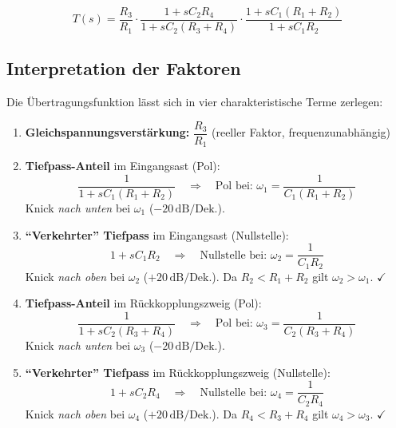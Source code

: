 \documentclass[12pt,a4paper]{article}
\begin{document}
\begin{tcolorbox}[ergebnis, title={\"Ubertragungsfunktion des PID-Reglers}]
\[
  \boxed{T(s) = \frac{R_3}{R_1}
         \cdot \frac{1 + sC_2 R_4}{1 + sC_2(R_3 + R_4)}
         \cdot \frac{1 + sC_1(R_1 + R_2)}{1 + sC_1 R_2}}
\]
\end{tcolorbox}

\subsection{Interpretation der Faktoren}

Die Übertragungsfunktion lässt sich in vier charakteristische Terme zerlegen:

\begin{enumerate}[label=\textbf{\arabic{enumi}.}]
  \item \textbf{Gleichspannungsverstärkung:} $\dfrac{R_3}{R_1}$ (reeller Faktor, frequenzunabhängig)

  \item \textbf{Tiefpass-Anteil} im Eingangsast (Pol):
    \[
      \frac{1}{1 + sC_1(R_1+R_2)}
      \quad \Rightarrow \quad
      \text{Pol bei: } \omega_1 = \frac{1}{C_1(R_1+R_2)}
    \]
    Knick \textit{nach unten} bei $\omega_1$ ($-20\,\text{dB/Dek.}$).

  \item \textbf{``Verkehrter'' Tiefpass} im Eingangsast (Nullstelle):
    \[
      1 + sC_1 R_2
      \quad \Rightarrow \quad
      \text{Nullstelle bei: } \omega_2 = \frac{1}{C_1 R_2}
    \]
    Knick \textit{nach oben} bei $\omega_2$ ($+20\,\text{dB/Dek.}$). Da $R_2 < R_1+R_2$ gilt $\omega_2 > \omega_1$. $\checkmark$

  \item \textbf{Tiefpass-Anteil} im Rückkopplungszweig (Pol):
    \[
      \frac{1}{1 + sC_2(R_3+R_4)}
      \quad \Rightarrow \quad
      \text{Pol bei: } \omega_3 = \frac{1}{C_2(R_3+R_4)}
    \]
    Knick \textit{nach unten} bei $\omega_3$ ($-20\,\text{dB/Dek.}$).

  \item \textbf{``Verkehrter'' Tiefpass} im Rückkopplungszweig (Nullstelle):
    \[
      1 + sC_2 R_4
      \quad \Rightarrow \quad
      \text{Nullstelle bei: } \omega_4 = \frac{1}{C_2 R_4}
    \]
    Knick \textit{nach oben} bei $\omega_4$ ($+20\,\text{dB/Dek.}$). Da $R_4 < R_3+R_4$ gilt $\omega_4 > \omega_3$. $\checkmark$
\end{enumerate}

\end{document}
